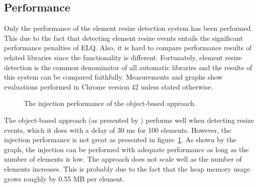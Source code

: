 \documentclass[]{llncs}
\newcommand{\elq}{ELQ}
\begin{document}
  \subsection{Performance}\label{sec:eval-perf}
    Only the performance of the element resize detection system has been performed.
    This due to the fact that detecting element resize events entails the significant performance penalties of \elq{}.
    Also, it is hard to compare performance results of related libraries since the functionality is different.
    Fortunately, element resize detection is the common denominator of all automatic libraries and the results of this system can be compared faithfully.
    Measurements and graphs show evaluations performed in Chrome version 42 unless stated otherwise.
    \begin{figure}[h]
      \tiny
      \begin{center}
        \begin{minipage}[t]{.5\textwidth}
          \vspace{0pt}
          \centering
        \end{minipage}%
      \caption{The injection performance of the object-based approach.}
      \label{fig:erd-original-object}
      \end{center}
    \end{figure}
    \newline\indent
    The object-based approach (as presented by \cite{backalley}) performs well when detecting resize events, which it does with a delay of 30 ms for 100 elements.
    However, the injection performance is not great as presented in figure~\ref{fig:erd-original-object}.
    As shown by the graph, the injection can be performed with adequate performance as long as the number of elements is low.
    The approach does not scale well as the number of elements increases.
    This is probably due to the fact that the heap memory usage grows roughly by 0.55 MB per element.
\end{document}
